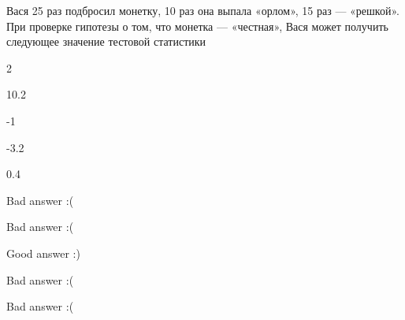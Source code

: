 
\begin{question}
Вася 25 раз подбросил монетку, 10 раз она выпала «орлом», 15 раз ---
«решкой». При проверке гипотезы о том, что монетка --- «честная», Вася
может получить следующее значение тестовой статистики
\begin{answerlist}
  \item 2
  \item 10.2
  \item -1
  \item -3.2
  \item 0.4
\end{answerlist}
\end{question}

\begin{solution}
\begin{answerlist}
  \item Bad answer :(
  \item Bad answer :(
  \item Good answer :)
  \item Bad answer :(
  \item Bad answer :(
\end{answerlist}
\end{solution}


